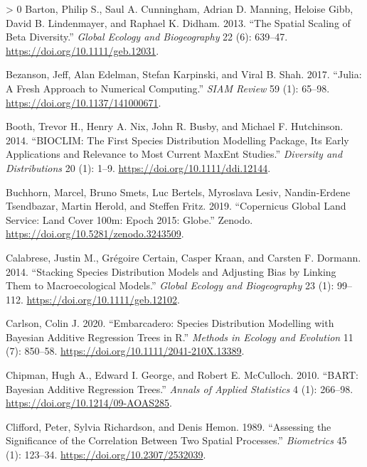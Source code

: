 \documentclass[11pt]{article}
\newlength{\cslhangindent}
\newenvironment{CSLReferences}[3] %
 {%
  \setlength{\parindent}{0pt}
  \ifodd #1 \everypar{\setlength{\hangindent}{\cslhangindent}}\ignorespaces\fi
  \ifnum #2 > 0
  \setlength{\parskip}{#2\baselineskip}
  \fi
 }%
 {}
\begin{document}
\hypertarget{refs}{}
\begin{CSLReferences}{1}{0}
\leavevmode\hypertarget{ref-Barton2013SpaSca}{}%
Barton, Philip S., Saul A. Cunningham, Adrian D. Manning, Heloise Gibb,
David B. Lindenmayer, and Raphael K. Didham. 2013. {``The Spatial
Scaling of Beta Diversity.''} \emph{Global Ecology and Biogeography} 22
(6): 639--47. \url{https://doi.org/10.1111/geb.12031}.

\leavevmode\hypertarget{ref-Bezanson2017JulFre}{}%
Bezanson, Jeff, Alan Edelman, Stefan Karpinski, and Viral B. Shah. 2017.
{``Julia: A Fresh Approach to Numerical Computing.''} \emph{SIAM Review}
59 (1): 65--98. \url{https://doi.org/10.1137/141000671}.

\leavevmode\hypertarget{ref-Booth2014BioFir}{}%
Booth, Trevor H., Henry A. Nix, John R. Busby, and Michael F.
Hutchinson. 2014. {``BIOCLIM: The First Species Distribution Modelling
Package, Its Early Applications and Relevance to Most Current MaxEnt
Studies.''} \emph{Diversity and Distributions} 20 (1): 1--9.
\url{https://doi.org/10.1111/ddi.12144}.

\leavevmode\hypertarget{ref-Buchhorn2019CopGlo}{}%
Buchhorn, Marcel, Bruno Smets, Luc Bertels, Myroslava Lesiv,
Nandin-Erdene Tsendbazar, Martin Herold, and Steffen Fritz. 2019.
{``Copernicus Global Land Service: Land Cover 100m: Epoch 2015:
Globe.''} Zenodo. \url{https://doi.org/10.5281/zenodo.3243509}.

\leavevmode\hypertarget{ref-Calabrese2014StaSpe}{}%
Calabrese, Justin M., Grégoire Certain, Casper Kraan, and Carsten F.
Dormann. 2014. {``Stacking Species Distribution Models and Adjusting
Bias by Linking Them to Macroecological Models.''} \emph{Global Ecology
and Biogeography} 23 (1): 99--112.
\url{https://doi.org/10.1111/geb.12102}.

\leavevmode\hypertarget{ref-Carlson2020EmbSpe}{}%
Carlson, Colin J. 2020. {``Embarcadero: Species Distribution Modelling
with Bayesian Additive Regression Trees in R.''} \emph{Methods in
Ecology and Evolution} 11 (7): 850--58.
\url{https://doi.org/10.1111/2041-210X.13389}.

\leavevmode\hypertarget{ref-Chipman2010BarBay}{}%
Chipman, Hugh A., Edward I. George, and Robert E. McCulloch. 2010.
{``BART: Bayesian Additive Regression Trees.''} \emph{Annals of Applied
Statistics} 4 (1): 266--98. \url{https://doi.org/10.1214/09-AOAS285}.

\leavevmode\hypertarget{ref-Clifford1989AssSig}{}%
Clifford, Peter, Sylvia Richardson, and Denis Hemon. 1989. {``Assessing
the Significance of the Correlation Between Two Spatial Processes.''}
\emph{Biometrics} 45 (1): 123--34.
\url{https://doi.org/10.2307/2532039}.


\end{CSLReferences}
\end{document}
